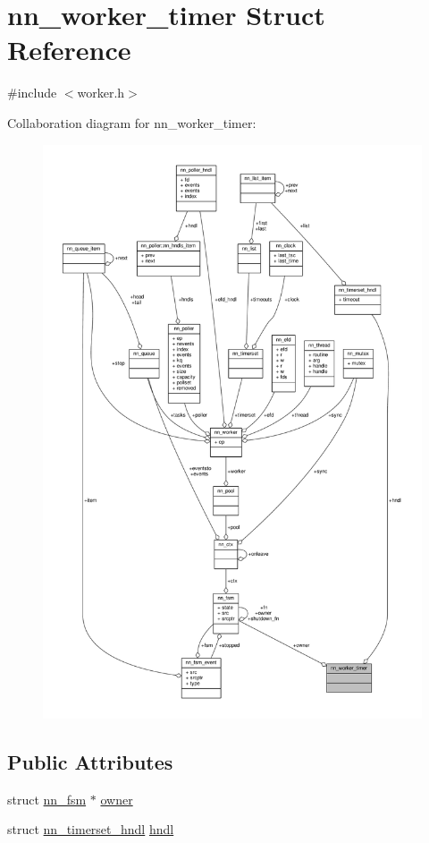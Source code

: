 \hypertarget{structnn__worker__timer}{}\section{nn\+\_\+worker\+\_\+timer Struct Reference}
\label{structnn__worker__timer}


{\ttfamily \#include $<$worker.\+h$>$}



Collaboration diagram for nn\+\_\+worker\+\_\+timer\+:\nopagebreak
\begin{figure}[H]
\begin{center}
\leavevmode
\includegraphics[width=350pt]{structnn__worker__timer__coll__graph}
\end{center}
\end{figure}
\subsection*{Public Attributes}
\begin{DoxyCompactItemize}
\item 
struct \hyperlink{structnn__fsm}{nn\+\_\+fsm} $\ast$ \hyperlink{structnn__worker__timer_afe2cfec1081fef9887670914c1a3195e}{owner}
\item 
struct \hyperlink{structnn__timerset__hndl}{nn\+\_\+timerset\+\_\+hndl} \hyperlink{structnn__worker__timer_abdd920512a278c6c4fa1db52e01b3ed1}{hndl}
\end{DoxyCompactItemize}


